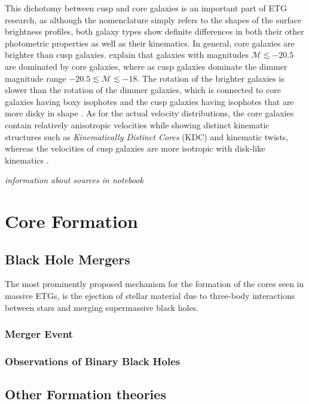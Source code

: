 \documentclass[english, oneside]{HYgradu}
\begin{document}
This dichotomy between cusp and core galaxies is an important part of ETG research, as although the nomenclature simply refers to the shapes of the surface brightness profiles, both galaxy types show definite differences in both their other photometric properties as well as their kinematics. In general, core galaxies are brighter than cusp galaxies. \cite{GalaxyFormationAndEvo2010} explain that galaxies with magnitudes $\mathcal{M} \lesssim -20.5$ are dominated by core galaxies, where as cusp galaxies dominate the dimmer magnitude range $-20.5 \lesssim \mathcal{M} \lesssim -18$. The rotation of the brighter galaxies is slower than the rotation of the dimmer galaxies, which is connected to core galaxies having boxy isophotes and the cusp galaxies having isophotes that are more disky in shape \citep{Faber1997}. As for the actual velocity distributions, the core galaxies contain relatively anisotropic velocities while showing distinct kinematic structures such as \textit{Kinematically Distinct Cores} (KDC) and kinematic twists, whereas the velocities of cusp galaxies are more isotropic with disk-like kinematics \citep{Kormendy2009, Krajnovic2008}.

\textit{information about sources in notebook}

\section{Core Formation}

\subsection{Black Hole Mergers}

The most prominently proposed mechanism for the formation of the cores seen in massive ETGs, is the ejection of stellar material due to three-body interactions between stars and merging supermassive black holes.

\subsubsection{Merger Event}

\subsubsection{Observations of Binary Black Holes}

\subsection{Other Formation theories}
\end{document}
